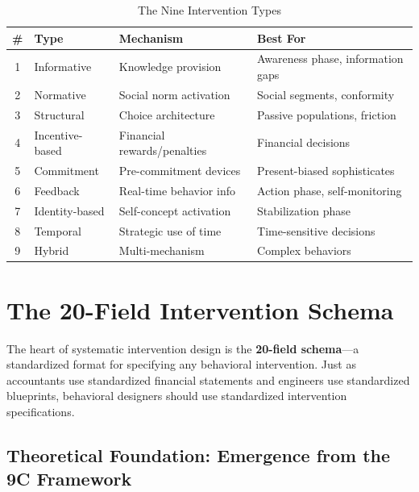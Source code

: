 \begin{table}[htbp]
\centering
\caption{The Nine Intervention Types}
\label{tab:17-types-summary}
\renewcommand{\arraystretch}{1.3}
\small
\begin{tabular}{@{}clll@{}}
\toprule
\textbf{\#} & \textbf{Type} & \textbf{Mechanism} & \textbf{Best For} \\
\midrule
1 & Informative & Knowledge provision & Awareness phase, information gaps \\
2 & Normative & Social norm activation & Social segments, conformity \\
3 & Structural & Choice architecture & Passive populations, friction \\
4 & Incentive-based & Financial rewards/penalties & Financial decisions \\
5 & Commitment & Pre-commitment devices & Present-biased sophisticates \\
6 & Feedback & Real-time behavior info & Action phase, self-monitoring \\
7 & Identity-based & Self-concept activation & Stabilization phase \\
8 & Temporal & Strategic use of time & Time-sensitive decisions \\
9 & Hybrid & Multi-mechanism & Complex behaviors \\
\bottomrule
\end{tabular}
\end{table}


\section{The 20-Field Intervention Schema}
\label{sec:17-schema}

The heart of systematic intervention design is the \textbf{20-field schema}---a standardized format for specifying any behavioral intervention. Just as accountants use standardized financial statements and engineers use standardized blueprints, behavioral designers should use standardized intervention specifications.

\subsection{Theoretical Foundation: Emergence from the 9C Framework}
\label{sec:17-emergence}

